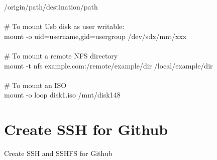\documentclass[10pt,a4paper]{article}
\begin{document}
/origin/path/destination/path\\
\\
\# To mount Usb disk as user writable:\\
mount -o uid=username,gid=usergroup /dev/sdx/mnt/xxx\\
\\
\# To mount a remote NFS directory\\
mount -t nfs example.com:/remote/example/dir /local/example/dir\\
\\
\# To mount an ISO\\
mount -o loop disk1.iso /mnt/disk148
\hypertarget{create_ssh_for_github}{\section {Create SSH for Github}}
Create SSH   and SSHFS for Github\\
\\
\end{document}
